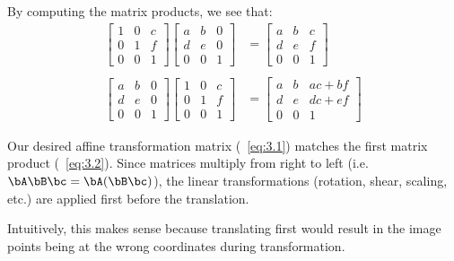 \begin{Answer}
  By computing the matrix products, we see that:
  \begin{align}
    \begin{bmatrix}
      1 & 0 & c \\
      0 & 1 & f \\
      0 & 0 & 1
    \end{bmatrix}
    \begin{bmatrix}
      a & b & 0 \\
      d & e & 0 \\
      0 & 0 & 1
    \end{bmatrix}
    &= 
    \begin{bmatrix}
      a & b & c \\
      d & e & f \\
      0 & 0 & 1
    \end{bmatrix}~\label{eq:3.2} \\
    \nonumber \\
    \begin{bmatrix}
      a & b & 0 \\
      d & e & 0 \\
      0 & 0 & 1
    \end{bmatrix}
    \begin{bmatrix}
      1 & 0 & c \\
      0 & 1 & f \\
      0 & 0 & 1
    \end{bmatrix}
    &=
    \begin{bmatrix}
      a & b & ac + bf \\
      d & e & dc + ef \\
      0 & 0 & 1
    \end{bmatrix}
  \end{align}

  Our desired affine transformation matrix (~\ref{eq:3.1}) matches the first
  matrix product (~\ref{eq:3.2}).
  Since matrices multiply from right to left
  (i.e. $\bA \bB \bc = \bA (\bB \bc)$),
  the linear transformations (rotation, shear, scaling, etc.)
  are applied first before the translation.

  Intuitively, this makes sense because translating first would
  result in the image points being at the wrong coordinates
  during transformation.
\end{Answer}
